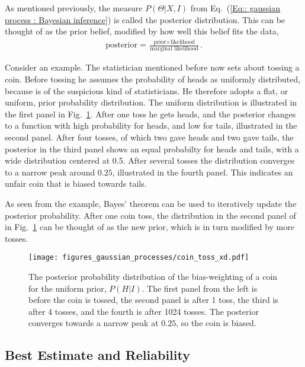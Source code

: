 \documentclass[twoside,english]{uiofysmaster}
\begin{document}
{{As mentioned previously, the measure $P(\Theta | X , I)$ from Eq.~(\ref{Eq:: gaussian process : Bayesian inference}) is called the posterior distribution. This can be thought of as the prior belief, modified by how well this belief fits the data,
\begin{align*}
\text{posterior} = \frac{\text{prior} \times \text{likelihood}}{\text{marginal likelihood}}.
\end{align*}

Consider an example. The statistician mentioned before now sets about tossing a coin. Before tossing he assumes the probability of heads as uniformly distributed, because is of the suspicious kind of statisticians. He therefore adopts a flat, or uniform, prior probability distribution. The uniform distribution is illustrated in the first panel in Fig.~\ref{Fig:: gaussian process : Dice throw }. After one toss he gets heads, and the posterior changes to a function with high probability for heads, and low for tails, illustrated in the second panel. After four tosses, of which two gave heads and two gave tails, the posterior in the third panel shows an equal probabilty for heads and tails, with a wide distribution centered at 0.5. After several tosses the distribution converges to a narrow peak around $0.25$, illustrated in the fourth panel. This indicates an unfair coin that is biased towards tails.

As seen from the example, Bayes' theorem can be used to iteratively update the posterior probability. After one coin toss, the distribution in the second panel of in Fig.~\ref{Fig:: gaussian process : Dice throw } can be thought of as the new prior, which is in turn modified by more tosses.

\begin{figure}
\texttt{[image: figures\_gaussian\_processes/coin\_toss\_xd.pdf]}
\caption{The posterior probability distribution of the bias-weighting of a coin for the uniform prior, $P(H|I)$. The first panel from the left is before the coin is tossed, the second panel is after 1 toss, the third is after 4 tosses, and the fourth is after 1024 tosses. The posterior converges towards a narrow peak at $0.25$, so the coin is biased.}
\label{Fig:: gaussian process : Dice throw }
\end{figure}


\subsection{Best Estimate and Reliability}\label{Sec:: gaussian process : Best estimate}

}}
\end{document}
